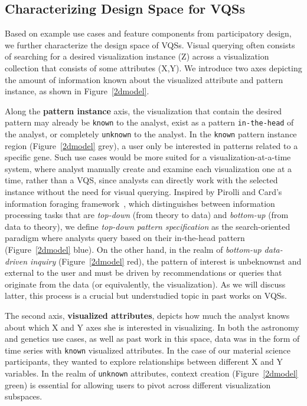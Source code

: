 \subsection{Characterizing Design Space for VQSs}
Based on example use cases and feature components from participatory design, we further characterize the design space of VQSs. Visual querying often consists of searching for a desired visualization instance (Z) across a visualization collection that consists of some attributes (X,Y). We introduce two axes depicting the amount of information known about the visualized attribute and pattern instance, as shown in Figure~\ref{2dmodel}.
\par Along the \textbf{pattern instance} axis, the visualization that contain the desired pattern may already be \texttt{known} to the analyst, exist as a pattern \texttt{in-the-head} of the analyst, or completely \texttt{unknown} to the analyst. In the \texttt{known} pattern instance region (Figure~\ref{2dmodel} grey), a user only be interested in patterns related to a specific gene. Such use cases would be more suited for a visualization-at-a-time system, where analyst manually create and examine each visualization one at a time, rather than a VQS, since analysts can directly work with the selected instance without the need for visual querying. Inspired by Pirolli and Card's information foraging framework~\cite{Pirolli}, which distinguishes between information processing tasks that are \textit{top-down} (from theory to data) and \textit{bottom-up} (from data to theory), we define \textit{top-down pattern specification} as the search-oriented paradigm where analysts query based on their in-the-head pattern (Figure~\ref{2dmodel} blue). On the other hand, in the realm of \textit{bottom-up data-driven inquiry} (Figure~\ref{2dmodel} red), the pattern of interest is unbeknownst and external to the user and must be driven by recommendations or queries that originate from the data (or equivalently, the visualization). As we will discuss latter, this process is a crucial but understudied topic in past works on VQSs.
\par The second axis, \textbf{visualized attributes}, depicts how much the analyst knows about which X and Y axes she is interested in visualizing. In both the astronomy and genetics use cases, as well as past work in this space, data was in the form of time series with \texttt{known} visualized attributes. In the case of our material science participants, they wanted to explore relationships between different X and Y variables. In the realm of \texttt{unknown} attributes, context creation (Figure~\ref{2dmodel} green) is essential for allowing users to pivot across different visualization subspaces. %
